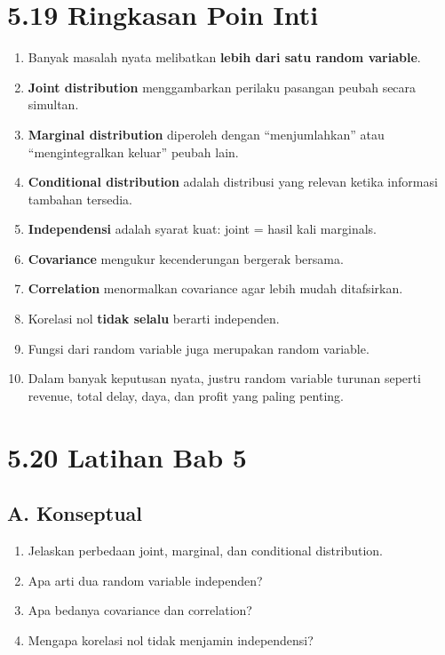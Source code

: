 \documentclass[
  letterpaper,
  DIV=11,
  numbers=noendperiod]{scrreprt}
\providecommand{\tightlist}{%
  \setlength{\itemsep}{0pt}\setlength{\parskip}{0pt}}
\begin{document}
\section{5.19 Ringkasan Poin Inti}\label{ringkasan-poin-inti-4}

\begin{enumerate}
\def\labelenumi{\arabic{enumi}.}
\tightlist
\item
  Banyak masalah nyata melibatkan \textbf{lebih dari satu random
  variable}.
\item
  \textbf{Joint distribution} menggambarkan perilaku pasangan peubah
  secara simultan.
\item
  \textbf{Marginal distribution} diperoleh dengan ``menjumlahkan'' atau
  ``mengintegralkan keluar'' peubah lain.
\item
  \textbf{Conditional distribution} adalah distribusi yang relevan
  ketika informasi tambahan tersedia.
\item
  \textbf{Independensi} adalah syarat kuat: joint = hasil kali
  marginals.
\item
  \textbf{Covariance} mengukur kecenderungan bergerak bersama.
\item
  \textbf{Correlation} menormalkan covariance agar lebih mudah
  ditafsirkan.
\item
  Korelasi nol \textbf{tidak selalu} berarti independen.
\item
  Fungsi dari random variable juga merupakan random variable.
\item
  Dalam banyak keputusan nyata, justru random variable turunan seperti
  revenue, total delay, daya, dan profit yang paling penting.
\end{enumerate}

\section{5.20 Latihan Bab 5}\label{latihan-bab-5}

\subsection{A. Konseptual}\label{a.-konseptual-4}

\begin{enumerate}
\def\labelenumi{\arabic{enumi}.}
\tightlist
\item
  Jelaskan perbedaan joint, marginal, dan conditional distribution.
\item
  Apa arti dua random variable independen?
\item
  Apa bedanya covariance dan correlation?
\item
  Mengapa korelasi nol tidak menjamin independensi?
\end{enumerate}
\end{document}
